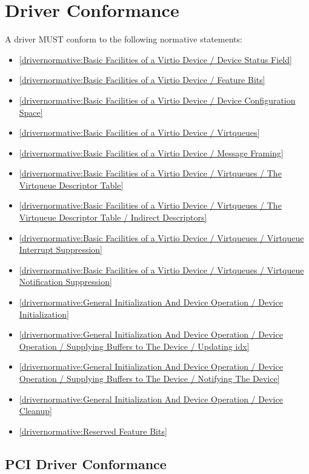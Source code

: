 \section{Driver Conformance}\label{sec:Conformance / Driver Conformance}

A driver MUST conform to the following normative statements:

\begin{itemize}
\item \ref{drivernormative:Basic Facilities of a Virtio Device / Device Status Field}
\item \ref{drivernormative:Basic Facilities of a Virtio Device / Feature Bits}
\item \ref{drivernormative:Basic Facilities of a Virtio Device / Device Configuration Space}
\item \ref{drivernormative:Basic Facilities of a Virtio Device / Virtqueues}
\item \ref{drivernormative:Basic Facilities of a Virtio Device / Message Framing}
\item \ref{drivernormative:Basic Facilities of a Virtio Device / Virtqueues / The Virtqueue Descriptor Table}
\item \ref{drivernormative:Basic Facilities of a Virtio Device / Virtqueues / The Virtqueue Descriptor Table / Indirect Descriptors}
\item \ref{drivernormative:Basic Facilities of a Virtio Device / Virtqueues / Virtqueue Interrupt Suppression}
\item \ref{drivernormative:Basic Facilities of a Virtio Device / Virtqueues / Virtqueue Notification Suppression}
\item \ref{drivernormative:General Initialization And Device Operation / Device Initialization}
\item \ref{drivernormative:General Initialization And Device Operation / Device Operation / Supplying Buffers to The Device / Updating idx}
\item \ref{drivernormative:General Initialization And Device Operation / Device Operation / Supplying Buffers to The Device / Notifying The Device}
\item \ref{drivernormative:General Initialization And Device Operation / Device Cleanup}
\item \ref{drivernormative:Reserved Feature Bits}
\end{itemize}

\subsection{PCI Driver Conformance}\label{sec:Conformance / Driver Conformance / PCI Driver Conformance}

